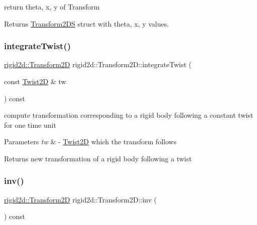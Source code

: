 return theta, x, y of Transform 

\begin{DoxyReturn}{Returns}
\hyperlink{structrigid2d_1_1Transform2DS}{Transform2\+DS} struct with theta, x, y values. 
\end{DoxyReturn}
\mbox{\label{classrigid2d_1_1Transform2D_a56730e2d2c235e3909361cc0774f1c6e}} 
\subsubsection{\texorpdfstring{integrate\+Twist()}{integrateTwist()}}
{\footnotesize\ttfamily \hyperlink{classrigid2d_1_1Transform2D}{rigid2d\+::\+Transform2D} rigid2d\+::\+Transform2\+D\+::integrate\+Twist (\begin{DoxyParamCaption}\item[{const \hyperlink{classrigid2d_1_1Twist2D}{Twist2D} \&}]{tw }\end{DoxyParamCaption}) const}



compute transformation corresponding to a rigid body following a constant twist for one time unit 


\begin{DoxyParams}{Parameters}
{\em tw} & -\/ \hyperlink{classrigid2d_1_1Twist2D}{Twist2D} which the transform follows \\
\hline
\end{DoxyParams}
\begin{DoxyReturn}{Returns}
new transformation of a rigid body following a twist 
\end{DoxyReturn}
\mbox{\label{classrigid2d_1_1Transform2D_a2d324a150b852834b68629159e1b723b}} 
\subsubsection{\texorpdfstring{inv()}{inv()}}
{\footnotesize\ttfamily \hyperlink{classrigid2d_1_1Transform2D}{rigid2d\+::\+Transform2D} rigid2d\+::\+Transform2\+D\+::inv (\begin{DoxyParamCaption}{ }\end{DoxyParamCaption}) const}



